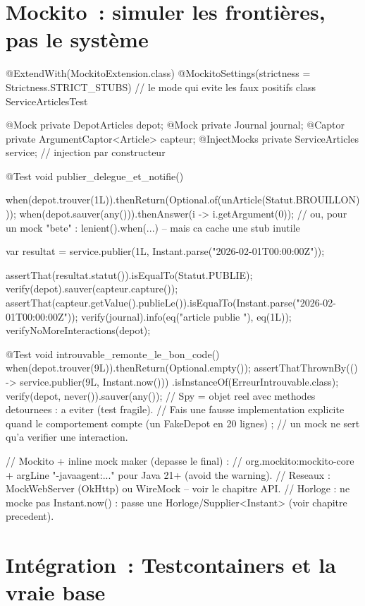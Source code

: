 \section{Mockito~: simuler les fronti\`eres, pas le syst\`eme}

\begin{codejava}
@ExtendWith(MockitoExtension.class)
@MockitoSettings(strictness = Strictness.STRICT_STUBS)      // le mode qui evite les faux positifs
class ServiceArticlesTest {

    @Mock private DepotArticles depot;
    @Mock private Journal journal;
    @Captor private ArgumentCaptor<Article> capteur;
    @InjectMocks private ServiceArticles service;            // injection par constructeur

    @Test void publier_delegue_et_notifie() {
        when(depot.trouver(1L)).thenReturn(Optional.of(unArticle(Statut.BROUILLON)));
        when(depot.sauver(any())).thenAnswer(i -> i.getArgument(0));
        // ou, pour un mock "bete" : lenient().when(...) -- mais ca cache une stub inutile

        var resultat = service.publier(1L, Instant.parse("2026-02-01T00:00:00Z"));

        assertThat(resultat.statut()).isEqualTo(Statut.PUBLIE);
        verify(depot).sauver(capteur.capture());
        assertThat(capteur.getValue().publieLe()).isEqualTo(Instant.parse("2026-02-01T00:00:00Z"));
        verify(journal).info(eq("article publie {}"), eq(1L));
        verifyNoMoreInteractions(depot);
    }

    @Test void introuvable_remonte_le_bon_code() {
        when(depot.trouver(9L)).thenReturn(Optional.empty());
        assertThatThrownBy(() -> service.publier(9L, Instant.now()))
                .isInstanceOf(ErreurIntrouvable.class);
        verify(depot, never()).sauver(any());
    }
    // Spy = objet reel avec methodes detournees : a eviter (test fragile).
    // Fais une fausse implementation explicite quand le comportement compte (un FakeDepot en 20 lignes) ;
    // un mock ne sert qu'a verifier une interaction.
}
// Mockito + inline mock maker (depasse le final) :
// org.mockito:mockito-core + argLine "-javaagent:..." pour Java 21+ (avoid the warning).
// Reseaux : MockWebServer (OkHttp) ou WireMock -- voir le chapitre API.
// Horloge : ne mocke pas Instant.now() : passe une Horloge/Supplier<Instant> (voir chapitre precedent).
\end{codejava}

\section{Int\'egration~: Testcontainers et la vraie base}

